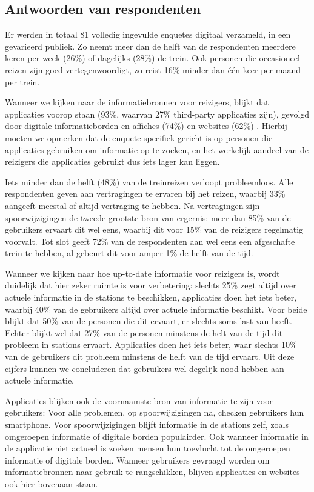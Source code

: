\subsection{Antwoorden van respondenten}
Er werden in totaal 81 volledig ingevulde enquetes digitaal verzameld, in een gevarieerd publiek. Zo neemt meer dan de helft van de respondenten meerdere keren per week (26\%) of dagelijks (28\%) de trein. Ook personen die occasioneel reizen zijn goed vertegenwoordigt, zo reist 16\% minder dan één keer per maand per trein.

Wanneer we kijken naar de informatiebronnen voor reizigers, blijkt dat  applicaties voorop staan (93\%, waarvan 27\% third-party applicaties zijn), gevolgd door digitale informatieborden en affiches (74\%) en websites (62\%) . Hierbij moeten we opmerken dat de enquete specifiek gericht is op personen die applicaties gebruiken om informatie op te zoeken, en het werkelijk aandeel van de reizigers die applicaties gebruikt dus iets lager kan liggen.

Iets minder dan de helft (48\%) van de treinreizen verloopt probleemloos. Alle respondenten geven aan vertragingen te ervaren bij het reizen, waarbij 33\% aangeeft meestal of altijd vertraging te hebben. Na vertragingen zijn spoorwijzigingen de tweede grootste bron van ergernis: meer dan 85\% van de gebruikers ervaart dit wel eens, waarbij dit voor 15\% van de reizigers regelmatig voorvalt. Tot slot geeft 72\% van de respondenten aan wel eens een afgeschafte trein te hebben, al gebeurt dit voor amper 1\% de helft van de tijd.

Wanneer we kijken naar hoe up-to-date informatie voor reizigers is, wordt duidelijk dat hier zeker ruimte is voor verbetering: slechts 25\% zegt altijd over actuele informatie in de stations te beschikken, applicaties doen het iets beter, waarbij 40\% van de gebruikers altijd over actuele informatie beschikt. Voor beide blijkt dat 50\% van de personen die dit ervaart, er slechts soms last van heeft. Echter blijkt wel dat 27\% van de personen minstens de helt van de tijd dit probleem in stations ervaart. Applicaties doen het iets beter, waar slechts 10\% van de gebruikers dit probleem minstens de helft van de tijd ervaart. Uit deze cijfers kunnen we concluderen dat gebruikers wel degelijk nood hebben aan actuele informatie. 

Applicaties blijken ook de voornaamste bron van informatie te zijn voor gebruikers: Voor alle problemen, op spoorwijzigingen na, checken gebruikers hun smartphone. Voor spoorwijzigingen blijft informatie in de stations zelf, zoals omgeroepen informatie of digitale borden populairder. Ook wanneer informatie in de applicatie niet actueel is zoeken mensen hun toevlucht tot de omgeroepen informatie of digitale borden. Wanneer gebruikers gevraagd worden om informatiebronnen naar gebruik te rangschikken, blijven applicaties en websites ook hier bovenaan staan.

